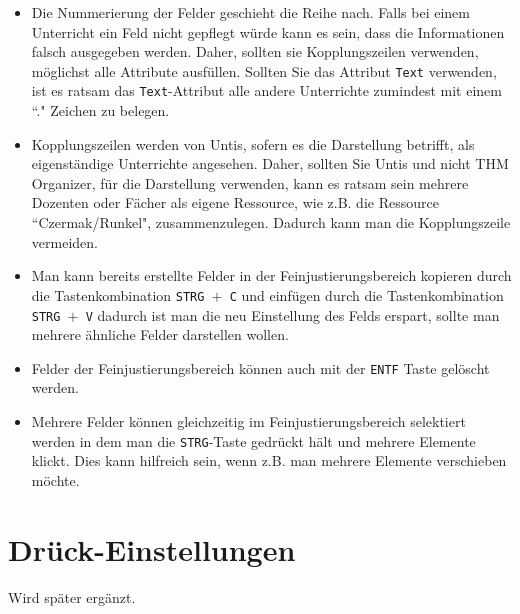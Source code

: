 \begin{itemize}
	\item Die Nummerierung der Felder geschieht die Reihe nach. Falls bei einem Unterricht ein Feld nicht gepflegt würde kann es sein, dass die Informationen falsch ausgegeben werden. Daher, sollten sie Kopplungszeilen verwenden, möglichst alle Attribute ausfüllen. Sollten Sie das Attribut \texttt{Text} verwenden, ist es ratsam das \texttt{Text}-Attribut alle andere Unterrichte zumindest mit einem ``." \hspace{1pt} Zeichen zu belegen.
	\item Kopplungszeilen werden von Untis, sofern es die Darstellung betrifft, als eigenständige Unterrichte angesehen. Daher, sollten Sie Untis und nicht THM Organizer, für die Darstellung verwenden, kann es ratsam sein mehrere Dozenten oder Fächer als eigene Ressource, wie z.B. die Ressource ``Czermak/Runkel", zusammenzulegen. Dadurch kann man die Kopplungszeile vermeiden.
	\item Man kann bereits erstellte Felder in der Feinjustierungsbereich kopieren durch die Tastenkombination \texttt{STRG $+$ C} und einfügen durch die Tastenkombination \texttt{STRG $+$ V} dadurch ist man die neu Einstellung des Felds erspart, sollte man mehrere ähnliche Felder darstellen wollen.
	\item Felder der Feinjustierungsbereich können auch mit der \texttt{ENTF} Taste gelöscht werden.
	\item Mehrere Felder können gleichzeitig im Feinjustierungsbereich selektiert werden in dem man die \texttt{STRG}-Taste gedrückt hält und mehrere Elemente klickt. Dies kann hilfreich sein, wenn z.B. man mehrere Elemente verschieben möchte.
\end{itemize}



\section{Drück-Einstellungen}
\label{sec:druck-einstellungen}

Wird später ergänzt.